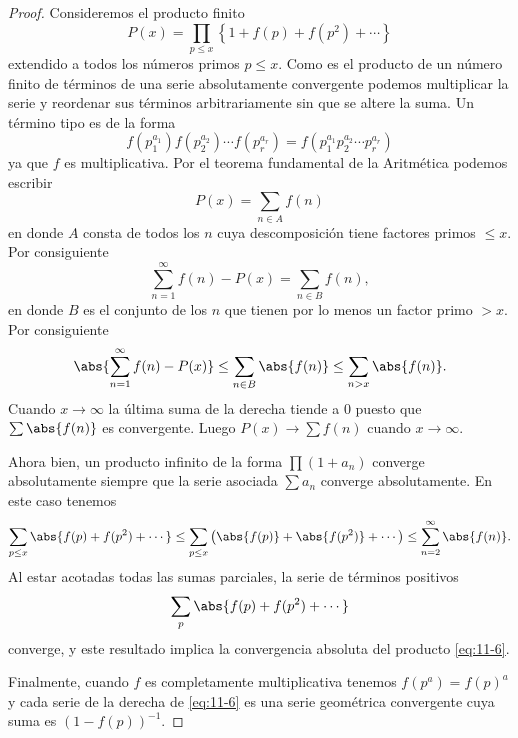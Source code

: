 \documentclass[12pt,a4paper]{book}
\begin{document}
    \begin{proof}
        Consideremos el producto finito
        \begin{equation*}
            P(x)=\prod_{p\leq x}\left\{1+f(p)+f(p^{2})+\cdots\right\}
        \end{equation*}
        extendido a todos los números primos $p\leq x$. Como es el producto de un número
        finito de términos de una serie absolutamente convergente podemos multiplicar la
        serie y reordenar sus términos arbitrariamente sin que se altere la suma. Un término
        tipo es de la forma
        \begin{equation*}
            f(p_{1}^{a_{1}})f(p_{2}^{a_{2}})\cdots f(p_{r}^{a_{r}})=f(p_{1}^{a_{1}}p_{2}^{a_{2}}\cdots p_{r}^{a_{r}})
        \end{equation*}
        ya que $f$ es multiplicativa. Por el teorema fundamental de la Aritmética podemos
        escribir
        \begin{equation*}
            P(x)=\sum_{n\in A}f(n)
        \end{equation*}
        en donde $A$ consta de todos los $n$ cuya descomposición tiene factores primos
        $\leq x$. Por consiguiente
        \begin{equation*}
            \sum_{n=1}^{\infty}f(n)-P(x)=\sum_{n\in B}f(n),
        \end{equation*}
        en donde $B$ es el conjunto de los $n$ que tienen por lo menos un factor primo $>x$.
        Por consiguiente
        \begin{equation*}
            \abs{\sum_{n=1}^{\infty}f(n)-P(x)}\leq\sum_{n\in B}\abs{f(n)}\leq\sum_{n>x}\abs{f(n)}.
        \end{equation*}
        Cuando $x\to\infty$ la última suma de la derecha tiende a 0 puesto que $\sum\abs{f(n)}$
        es convergente. Luego $P(x)\to\sum f(n)$ cuando $x\to\infty$.

        Ahora bien, un producto infinito de la forma $\prod(1+a_{n})$ converge absolutamente
        siempre que la serie asociada $\sum a_{n}$ converge absolutamente. En este caso
        tenemos
        \begin{equation*}
            \sum_{p\leq x}\abs{f(p)+f(p^{2})+\cdots}\leq\sum_{p\leq x}\left(\abs{f(p)}+\abs{f(p^{2})}+\cdots\right)\leq\sum_{n=2}^{\infty}\abs{f(n)}.
        \end{equation*}
        Al estar acotadas todas las sumas parciales, la serie de términos positivos
        \begin{equation*}
            \sum_{p}\abs{f(p)+f(p^{2})+\cdots}
        \end{equation*}
        converge, y este resultado implica la convergencia absoluta del producto
        \eqref{eq:11-6}.

        Finalmente, cuando $f$ es completamente multiplicativa tenemos $f(p^{a})=f(p)^{a}$ y cada
        serie de la derecha de \eqref{eq:11-6} es una serie geométrica convergente cuya suma
        es $(1-f(p))^{-1}$.
    \end{proof}
\end{document}
